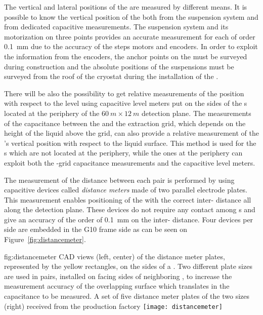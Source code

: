 The vertical and lateral positions of the  are measured by different means. 
It is possible to know the vertical position of the  both from the suspension system and from dedicated capacitive measurements.
The  suspension system and its motorization on three points provides an accurate measurement for each  of order \SI{0.1}{mm} due to the accuracy of the steps motors and encoders. 
In order to exploit the information from the encoders,  the anchor points on the  must be surveyed during construction and the absolute positions of the suspensions must be surveyed from the roof of the cryostat during the installation of the \fdth.

There will be also the possibility to get relative measurements of the  position with respect to the \lar level using capacitive level meters put on the sides of the s located at the periphery of the  $\SI{60}{m}\times\SI{12}{m}$ detection plane.  The  measurements of the capacitance between the  and the extraction grid, which depends on the height of the liquid above the grid, can also provide a relative measurement  of the 's vertical position with respect to the liquid surface. This method is used for the s which are not located at the periphery, while the ones at the periphery can exploit both the  -grid capacitance measurements and the capacitive level meters.
 
The measurement of the distance between each  pair is performed by using capacitive devices called \textit{distance meters} made of two parallel electrode plates.  
This measurement enables positioning of the  with the correct  inter- distance all along the detection plane. These devices do not require any contact among  s and give an accuracy of the order of \SI{0.1}{mm} on the  inter- distance.  Four devices per  side are embedded in the G10 frame side as can be seen on Figure~\ref{fig:distancemeter}.

\begin{dunefigure}{fig:distancemeter}
{CAD views (left, center) of the distance meter plates, represented by the yellow rectangles, on the sides of a . Two different plate sizes are used in pairs, installed on facing sides of neighboring , %
to increase the measurement accuracy of the overlapping surface which translates in the capacitance to be measured. A set of five distance meter plates of the two sizes (right) received from the production factory}
\texttt{[image: distancemeter]}
\end{dunefigure}

